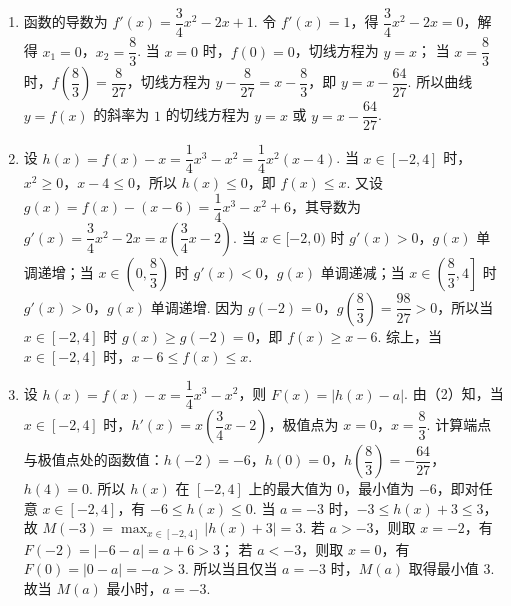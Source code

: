\begin{solution}
\begin{enumerate}
\item 函数的导数为 \(f'(x)=\dfrac34x^2-2x+1\). 令 \(f'(x)=1\)，得 \(\dfrac34x^2-2x=0\)，解得 \(x_1=0\)，\(x_2=\dfrac83\).
当 \(x=0\) 时，\(f(0)=0\)，切线方程为 \(y=x\)；
当 \(x=\dfrac83\) 时，\(f\left(\dfrac83\right)=\dfrac{8}{27}\)，切线方程为 \(y-\dfrac{8}{27}=x-\dfrac83\)，即 \(y=x-\dfrac{64}{27}\).
所以曲线 \(y=f(x)\) 的斜率为 \(1\) 的切线方程为 \(y=x\) 或 \(y=x-\dfrac{64}{27}\).

\item 设 \(h(x)=f(x)-x=\dfrac14x^3-x^2=\dfrac14x^2(x-4)\).
当 \(x\in[-2,4]\) 时，\(x^2\ge0\)，\(x-4\le0\)，所以 \(h(x)\le0\)，即 \(f(x)\le x\).
又设 \(g(x)=f(x)-(x-6)=\dfrac14x^3-x^2+6\)，其导数为 \(g'(x)=\dfrac34x^2-2x=x\left(\dfrac34x-2\right)\).
当 \(x\in[-2,0)\) 时 \(g'(x)>0\)，\(g(x)\) 单调递增；当 \(x\in\left(0,\dfrac83\right)\) 时 \(g'(x)<0\)，\(g(x)\) 单调递减；当 \(x\in\left(\dfrac83,4\right]\) 时 \(g'(x)>0\)，\(g(x)\) 单调递增.
因为 \(g(-2)=0\)，\(g\left(\dfrac83\right)=\dfrac{98}{27}>0\)，所以当 \(x\in[-2,4]\) 时 \(g(x)\ge g(-2)=0\)，即 \(f(x)\ge x-6\).
综上，当 \(x\in[-2,4]\) 时，\(x-6\le f(x)\le x\).

\item 设 \(h(x)=f(x)-x=\dfrac14x^3-x^2\)，则 \(F(x)=|h(x)-a|\).
由（2）知，当 \(x\in[-2,4]\) 时，\(h'(x)=x\left(\dfrac34x-2\right)\)，极值点为 \(x=0\)，\(x=\dfrac83\).
计算端点与极值点处的函数值：\(h(-2)=-6\)，\(h(0)=0\)，\(h\left(\dfrac83\right)=-\dfrac{64}{27}\)，\(h(4)=0\).
所以 \(h(x)\) 在 \([-2,4]\) 上的最大值为 \(0\)，最小值为 \(-6\)，即对任意 \(x\in[-2,4]\)，有 \(-6\le h(x)\le0\).
当 \(a=-3\) 时，\(-3\le h(x)+3\le3\)，故 \(M(-3)=\max_{x\in[-2,4]}|h(x)+3|=3\).
若 \(a>-3\)，则取 \(x=-2\)，有 \(F(-2)=|-6-a|=a+6>3\)；
若 \(a<-3\)，则取 \(x=0\)，有 \(F(0)=|0-a|=-a>3\).
所以当且仅当 \(a=-3\) 时，\(M(a)\) 取得最小值 \(3\).
故当 \(M(a)\) 最小时，\(a=-3\).
\end{enumerate}
\end{solution}
